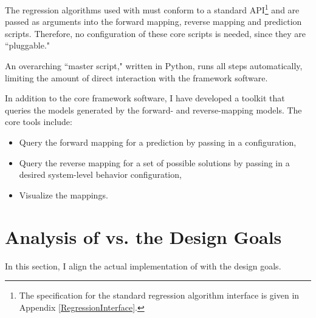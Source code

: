 The regression algorithms used with \fw must conform to a standard API\footnote{The specification for the standard regression algorithm interface is given in Appendix \ref{RegressionInterface}.} and are passed as arguments into the forward mapping, reverse mapping and prediction scripts.
Therefore, no configuration of these core scripts is needed, since they are ``pluggable."

An overarching ``master script," written in Python, runs all steps automatically, limiting the amount of direct interaction with the framework software.

In addition to the core framework software, I have developed a toolkit that queries the models generated by the forward- and reverse-mapping models.
The core tools include:
\begin{itemize}
   \item Query the forward mapping for a prediction by passing in a configuration,
   \item Query the reverse mapping for a set of possible solutions by passing in a desired system-level behavior configuration,
   \item Visualize the mappings.
\end{itemize}






\section{Analysis of \fw  vs. the Design Goals}
In this section, I align the actual implementation of \fw with the design goals.



